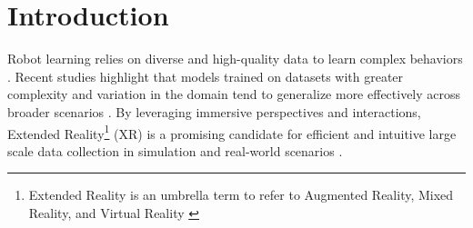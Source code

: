 \section{Introduction}




Robot learning relies on diverse and high-quality data to learn complex behaviors \cite{aldaco2024aloha, wang2024dexcap}.
Recent studies highlight that models trained on datasets with greater complexity and variation in the domain tend to generalize more effectively across broader scenarios \cite{mann2020language, radford2021learning, gao2024efficient}.
By leveraging immersive perspectives and interactions, Extended Reality\footnote{Extended Reality is an umbrella term to refer to Augmented Reality, Mixed Reality, and Virtual Reality \cite{wikipediaExtendedReality}}
(XR)
is a promising candidate for efficient and intuitive large scale data collection \cite{jiang2024comprehensive, arcade}
in simulation \cite{jiang2024comprehensive, arcade, dexhub-park} and real-world scenarios \cite{openteach, opentelevision}.
